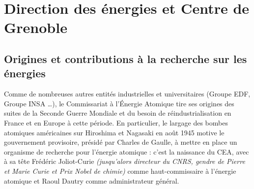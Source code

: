 %
%
%


\chapter{Direction des énergies et Centre de Grenoble}\label{ch:direction-des-energies-et-centre-de-grenoble}


\section{Origines et contributions à la recherche sur les énergies}\label{sec:origines-et-contributions-a-la-recherche-sur-les-energies}

Comme de nombreuses autres entités industrielles et universitaires (Groupe EDF, Groupe INSA \ldots), le Commissariat à l'Énergie Atomique
tire ses origines des suites de la Seconde Guerre Mondiale et du besoin de réindustrialisation en France et en Europe à cette période.
En particulier, le largage des bombes atomiques américaines sur Hiroshima et Nagasaki en août 1945 motive le gouvernement provisoire, présidé par Charles de Gaulle, à mettre en place un organisme de recherche pour l'énergie atomique : c'est la naissance du \gls{CEA}, avec à sa tête Frédéric Joliot-Curie \textit{(jusqu'alors directeur du CNRS, gendre de Pierre et Marie Curie et Prix Nobel de chimie)} comme haut-commissaire à l'énergie atomique et Raoul Dautry comme administrateur général.

